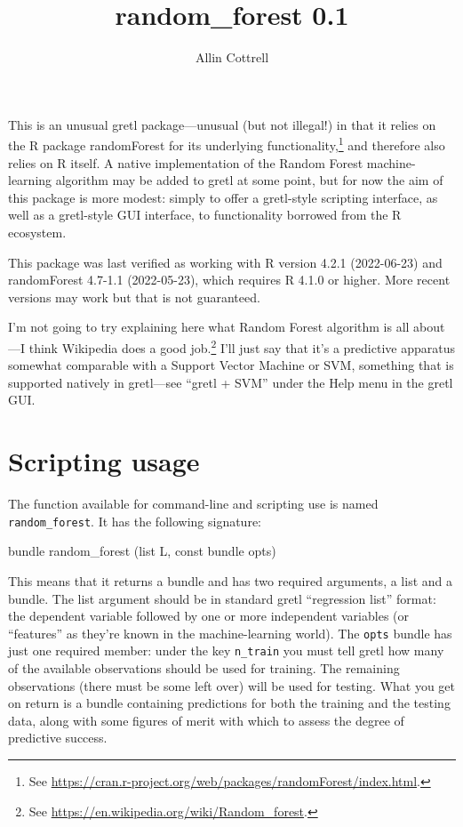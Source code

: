 \documentclass{article}
\begin{document}
\setlength{\parindent}{0pt}
\setlength{\parskip}{1ex}

\title{random\_forest 0.1}
\author{Allin Cottrell}
\maketitle

This is an unusual gretl package---unusual (but not illegal!) in that
it relies on the \textsf{R} package \textsf{randomForest} for its
underlying functionality,\footnote{See
  \url{https://cran.r-project.org/web/packages/randomForest/index.html}.}
and therefore also relies on \textsf{R} itself. A native
implementation of the Random Forest machine-learning algorithm may be
added to gretl at some point, but for now the aim of this package is
more modest: simply to offer a gretl-style scripting interface, as
well as a gretl-style GUI interface, to functionality borrowed from
the \textsf{R} ecosystem.

This package was last verified as working with \textsf{R} version
4.2.1 (2022-06-23) and \textsf{randomForest} 4.7-1.1 (2022-05-23),
which requires \textsf{R} 4.1.0 or higher. More recent versions may
work but that is not guaranteed.

I'm not going to try explaining here what Random Forest algorithm is
all about---I think Wikipedia does a good job.\footnote{See
  \url{https://en.wikipedia.org/wiki/Random_forest}.} I'll just say
that it's a predictive apparatus somewhat comparable with a Support
Vector Machine or SVM, something that is supported natively in
gretl---see ``gretl + SVM'' under the \textsf{Help} menu in the gretl
GUI.

\section{Scripting usage}

The function available for command-line and scripting use is named
\texttt{random\_forest}. It has the following signature:
%
\begin{code}
bundle random_forest (list L, const bundle opts)
\end{code}
%
This means that it returns a bundle and has two required arguments, a
list and a bundle. The list argument should be in standard gretl
``regression list'' format: the dependent variable followed by one or
more independent variables (or ``features'' as they're known in the
machine-learning world). The \texttt{opts} bundle has just one
required member: under the key \texttt{n\_train} you must tell gretl
how many of the available observations should be used for training.
The remaining observations (there must be some left over) will be used
for testing. What you get on return is a bundle containing predictions
for both the training and the testing data, along with some figures of
merit with which to assess the degree of predictive success.
\end{document}
